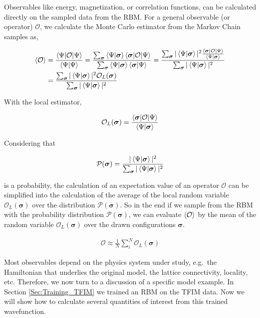 \documentclass[submission, Phys]{SciPost}
\begin{document}
Observables like energy, magnetization, or correlation functions, can be calculated directly on the sampled data from the RBM. 
For a general observable (or operator) $\mathcal{O}$, we calculate the Monte Carlo estimator from the Markov Chain samples as,

\begin{align}
\braket{\mathcal{O}} &= \frac{\braket{\Psi | \mathcal{O} | \Psi}}{\braket{\Psi | \Psi}} = \frac{\sum_{\bm{\sigma}} \braket{\Psi | {\bm{\sigma}}} \braket{{\bm{\sigma}} | \mathcal{O} | \Psi}}{\sum_{\bm{\sigma}} \braket{\Psi | {\bm{\sigma}}} \braket{{\bm{\sigma}} | \Psi}} = \frac{\sum_{\bm{\sigma}} | \braket{\Psi | {\bm{\sigma}}} |^2 \frac{\braket{{\bm{\sigma}} | \mathcal{O} | \Psi}}{\braket{\Psi | {\bm{\sigma}}}} }{\sum_{\bm{\sigma}}  | \braket{\Psi | {\bm{\sigma}}} |^2} \\
&= \frac{\sum_{\bm{\sigma}} | \braket{\Psi | {\bm{\sigma}}} |^2 \mathcal{O}_L({\bm{\sigma}}) }{\sum_{\bm{\sigma}}  | \braket{\Psi | {\bm{\sigma}}} |^2} 
\end{align}

With the local estimator,

\begin{equation}
\mathcal{O}_L({\bm{\sigma}}) =  \frac{\braket{{\bm{\sigma}} | \mathcal{O} | \Psi}}{\braket{\Psi | {\bm{\sigma}}}} 
\end{equation}

Considering that

\begin{equation}
\mathcal{P}({\bm{\sigma}}) = \frac{ | \braket{\Psi | {\bm{\sigma}}} |^2  }{\sum_{\bm{\sigma}}  | \braket{\Psi | {\bm{\sigma}}} |^2} 
\end{equation}

is a probability, the calculation of an expectation value of an operator $\mathcal{O}$ can be simplified into the calculation of  the average of the local random variable $\mathcal{O}_L({\bm{\sigma}})$ over the distribution $\mathcal{P}({\bm{\sigma}})$.
So in the end if we sample from the RBM with the probability distribution $\mathcal{P}({\bm{\sigma}})$, we can evaluate $\braket{\mathcal{O}}$ by the mean of the random variable $\mathcal{O}_L({\bm{\sigma}})$ over the drawn configurations ${\bm{\sigma}}$.

\begin{align}
\label{Eq:}
\mathcal{O} \approx \frac{1}{N} \sum_i^N \mathcal{O}_L({\bm{\sigma}})
\end{align}

Most observables depend on the physics system under study, e.g.~the Hamiltonian that underlies the original model, the lattice connectivity, locality, etc.  Therefore, we now turn to a discussion of a specific model example. In Section \ref{Sec:Training_TFIM} we trained an RBM on the TFIM data. Now we will show how to calculate several quantities of interest from this trained wavefunction.
\end{document}
